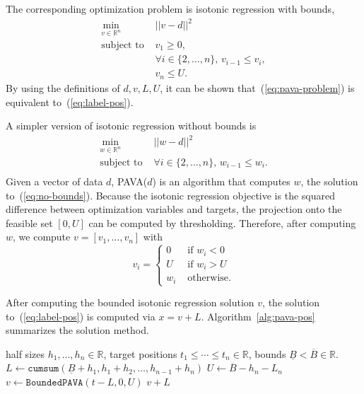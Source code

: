 \documentclass{article}
\begin{document}
The corresponding optimization problem is isotonic regression with bounds,
\begin{equation}
    \label{eq:pava-problem}
\begin{aligned}
  \min_{v\in\mathbb R^n} & ||v-d||^2 \\
  \text{subject to }& v_1 \geq 0 ,\\
                    & \forall i\in\{2, \dots, n\},\, v_{i-1} \leq v_{i},\\
   & v_n\leq U.
\end{aligned}
\end{equation}
By using the definitions of $d,v,L,U$, it can be shown that~(\ref{eq:pava-problem}) is equivalent to~(\ref{eq:label-pos}).

A simpler version of isotonic regression without bounds is
\begin{equation}
    \label{eq:no-bounds}
\begin{aligned}
 \min_{w\in\mathbb R^n} & ||w-d||^2 \\
  \text{subject to }& \forall i\in\{2, \dots, n\},\, w_{i-1} \leq w_{i}.\\
\end{aligned}
\end{equation}
Given a vector of data $d$, PAVA($d$) is an algorithm that computes $w$, the solution to~(\ref{eq:no-bounds}).
Because the isotonic regression objective is the squared difference between optimization variables and targets, the projection onto the feasible set $[0,U]$ can be computed by thresholding.
Therefore, after computing $w$, we compute $v = [ v_1, \dots, v_n ]$ with
\begin{equation}
    v_i = \begin{cases}
        0 & \text{ if } w_i < 0 \\
        U & \text{ if } w_i > U \\
        w_i & \text{ otherwise.}
    \end{cases}
\end{equation}

After computing the bounded isotonic regression solution $v$, the solution to~(\ref{eq:label-pos}) is computed via $x=v+L$.
Algorithm~\ref{alg:pava-pos} summarizes the solution method.

\begin{algorithm}
\begin{algorithmic}
  \Require half sizes $h_1,\dots,h_n\in\mathbb R$, target positions $t_1\leq\cdots\leq t_n\in\mathbb R$, bounds $\underline B<\overline B\in \mathbb R$.
  \State $L \gets \texttt{cumsum}(\underline B+h_1, h_1+h_2, \dots, h_{n-1}+h_n)$
  \State $U \gets \overline B-h_n-L_n$
  \State $v \gets \texttt{BoundedPAVA}(t-L, 0, U)$
  \State \Return $v+L$
\end{algorithmic}
  \caption{\label{alg:pava-pos}PAVA for label position optimization}
\end{algorithm}
\end{document}
